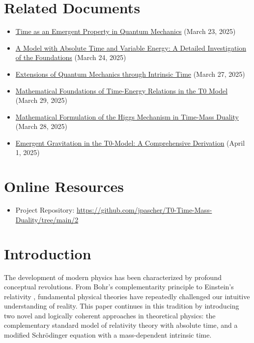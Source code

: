 \documentclass[a4paper,12pt]{article}
\begin{document}
	\section*{Related Documents}
	\begin{itemize}[leftmargin=*,nosep]
		\item \href{https://github.com/jpascher/T0-Time-Mass-Duality/tree/main/2/pdf/English/ZeitEmergentQMEn.pdf}{Time as an Emergent Property in Quantum Mechanics} (March 23, 2025)
		\item \href{https://github.com/jpascher/T0-Time-Mass-Duality/tree/main/2/pdf/English/ZeitMasseNeuerBlickEn.pdf}{A Model with Absolute Time and Variable Energy: A Detailed Investigation of the Foundations} (March 24, 2025)
		\item \href{https://github.com/jpascher/T0-Time-Mass-Duality/tree/main/2/pdf/English/NotwendigkeitQMErweiterungEn.pdf}{Extensions of Quantum Mechanics through Intrinsic Time} (March 27, 2025)
		\item \href{https://github.com/jpascher/T0-Time-Mass-Duality/tree/main/2/pdf/English/MathZeitMasseLagrangeEn.pdf}{Mathematical Foundations of Time-Energy Relations in the T0 Model} (March 29, 2025)
		\item \href{https://github.com/jpascher/T0-Time-Mass-Duality/tree/main/2/pdf/English/MathHiggsZeitMasseEn.pdf}{Mathematical Formulation of the Higgs Mechanism in Time-Mass Duality} (March 28, 2025)
		\item \href{https://github.com/jpascher/T0-Time-Mass-Duality/tree/main/2/pdf/English/EmergentGravT0En.pdf}{Emergent Gravitation in the T0-Model: A Comprehensive Derivation} (April 1, 2025)
	\end{itemize}
	
	\section*{Online Resources}
	\begin{itemize}[leftmargin=*,nosep]
		\item Project Repository: \url{https://github.com/jpascher/T0-Time-Mass-Duality/tree/main/2}
	\end{itemize}
	\newpage
	
	\section{Introduction}
	
	The development of modern physics has been characterized by profound conceptual revolutions. From Bohr's complementarity principle \cite{Bohr1928} to Einstein's relativity \cite{Einstein1905}, fundamental physical theories have repeatedly challenged our intuitive understanding of reality. This paper continues in this tradition by introducing two novel and logically coherent approaches in theoretical physics: the complementary standard model of relativity theory with absolute time, and a modified Schrödinger equation with a mass-dependent intrinsic time.
	
\end{document}
